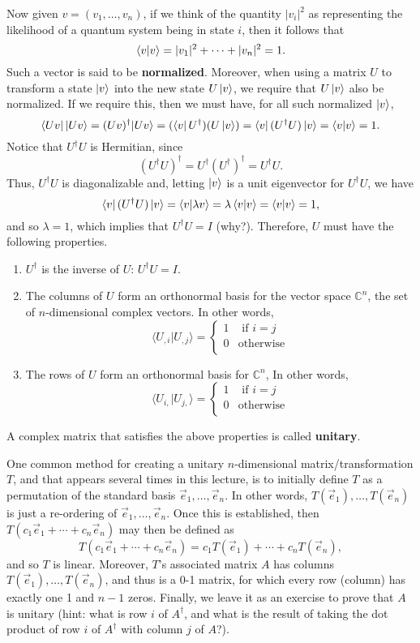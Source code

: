 \documentclass [12pt]{article}
\theoremstyle{definition}
\begin{document}
Now given $v=(v_1,\ldots,v_n)$, if we think of the quantity $|v_i|^2$ as representing the likelihood of a quantum system being in state $i$, then it follows that
\[\braket{v|v} = |v_1|^2+\cdots +|v_n|^2 = 1.\]
Such a vector is said to be \textbf{normalized}.
Moreover, 
when using a matrix $U$ to transform a state $\ket{v}$ into the new state $U\ket{v}$, we require that $U\ket{v}$ also be normalized. 
If we require this, then we must have, for all such normalized $\ket{v}$,
\[\bra{Uv}\ket{Uv} = (Uv)^{\dagger} | Uv\rangle = (\bra{v} U^{\dagger})( U \ket{v}) = \bra{v} (U^{\dagger}U) \ket{v} = \langle v|v\rangle =1.\]
Notice that $U^{\dagger}U$ is Hermitian, since 
\[(U^{\dagger}U)^{\dagger}= U^{\dagger}(U^{\dagger})^{\dagger} = U^{\dagger}U.\]
Thus, $U^{\dagger}U$ is diagonalizable and, letting 
 $\ket{v}$ is a unit eigenvector for $U^{\dagger}U$, we have
\[\bra{v} (U^{\dagger}U) \ket{v} =  \braket{v|\lambda v} = \lambda\braket{v|v} = \braket{v|v} =1,\]
and so $\lambda = 1$, which implies that $U^{\dagger}U = I$ (why?).
  Therefore, $U$ must have the following properties.
\begin{enumerate}
\item   $U^{\dagger}$ is the inverse of $U$: $U^\dagger U = I$.
\item The columns of $U$ form an orthonormal basis for the vector space $\mathbb{C}^n$, the set of $n$-dimensional complex vectors. In other words,
\[\langle U_{,i}|U_{,j}\rangle=\left\{\begin{array}{ll} 
1 & \mbox{ if } i=j\\
\mbox{0} & \mbox{otherwise}  \\
\end{array}\right.
\]
\item The rows of $U$ form an orthonormal basis for $\mathbb{C}^n$, In other words,
\[\langle U_{i,}|U_{j,}\rangle =\left\{\begin{array}{ll} 
1 & \mbox{ if } i=j\\
\mbox{0} & \mbox{otherwise}  \\
\end{array}\right.
\]
\end{enumerate}
A complex matrix that satisfies the above properties is called \textbf{unitary}.

\newpage
One common method for creating a unitary  $n$-dimensional matrix/transformation $T$, and that appears several times in this lecture, is to initially define $T$ 
as a permutation of the standard basis $\vec{e}_1,\ldots,\vec{e}_n$. In other words, $T(\vec{e}_1),\ldots,T(\vec{e}_n)$ is just a re-ordering of 
$\vec{e}_1,\ldots,\vec{e}_n$. Once this is established, then $T(c_1\vec{e}_1 + \cdots + c_n\vec{e}_n)$ may then be defined as 
\[T(c_1\vec{e}_1 + \cdots + c_n\vec{e}_n) = c_1T(\vec{e}_1) + \cdots + c_nT(\vec{e}_n),\]
and so $T$ is linear. Moreover, $T$'s associated matrix $A$ has columns $T(\vec{e}_1),\ldots,T(\vec{e}_n)$, and thus is a 0-1 matrix, for which every row (column) has exactly one 1
and $n-1$ zeros. Finally, we leave it as an exercise to prove that $A$ is unitary (hint: what is row $i$ of $A^{\dagger}$, and what is the result of taking the dot product of
row $i$ of $A^{\dagger}$ with column $j$ of $A$?).
\end{document}
